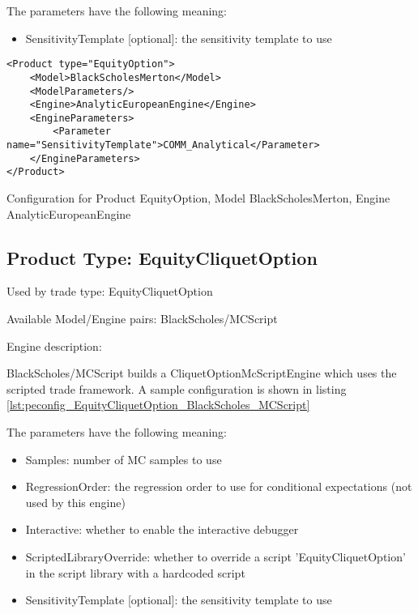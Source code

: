 The parameters have the following meaning:

\begin{itemize}
\item SensitivityTemplate [optional]: the sensitivity template to use 
\end{itemize}

\begin{longlisting}
\begin{verbatim}
<Product type="EquityOption">
    <Model>BlackScholesMerton</Model>
    <ModelParameters/>
    <Engine>AnalyticEuropeanEngine</Engine>
    <EngineParameters>
        <Parameter name="SensitivityTemplate">COMM_Analytical</Parameter>
    </EngineParameters>
</Product>
\end{verbatim}
\caption{Configuration for Product EquityOption, Model BlackScholesMerton, Engine AnalyticEuropeanEngine}
\label{lst:peconfig_EquityOption_BlackScholesMerton_AnalyticEuropeanEngine}
\end{longlisting}

\subsection{Product Type: EquityCliquetOption}

Used by trade type: EquityCliquetOption

Available Model/Engine pairs: BlackScholes/MCScript

Engine description:

BlackScholes/MCScript builds a CliquetOptionMcScriptEngine which uses the scripted trade framework. A sample
configuration is shown in listing \ref{lst:peconfig_EquityCliquetOption_BlackScholes_MCScript}

The parameters have the following meaning:

\begin{itemize}
\item Samples: number of MC samples to use
\item RegressionOrder: the regression order to use for conditional expectations (not used by this engine)
\item Interactive: whether to enable the interactive debugger
\item ScriptedLibraryOverride: whether to override a script 'EquityCliquetOption' in the script library with a hardcoded script
\item SensitivityTemplate [optional]: the sensitivity template to use 
\end{itemize}

